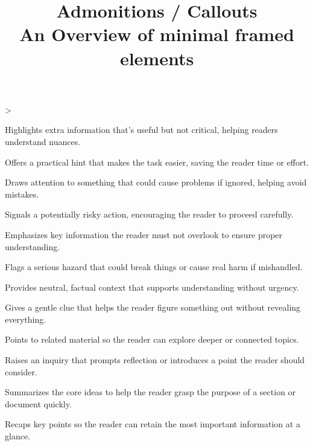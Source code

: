 \documentclass[twoside]{article}
\title{Admonitions / Callouts\\[0.5em]\large An Overview of \textbf{minimal} framed elements}
\author{}\date{}
\makeatletter
\newcommand\tsreplayfn{
\ts@loopcnt\z@
\loop
\advance\ts@loopcnt\@ne
\ifnum\ts@loopcnt>\ts@affilcnt\else
\xdef\@thefnmark{\csname ts@affilM\the\ts@loopcnt\endcsname}
\@footnotetext{\csname ts@affilT\the\ts@loopcnt\endcsname}
\repeat
}
\makeatother
\begin{document}
\twocolumn[{
\maketitle
}]
\tsreplayfn
\begin{tscallout}[kind=note]
Highlights extra information that's useful but not critical, helping readers understand nuances.
\end{tscallout}
\begin{tscallout}[kind=tip]
Offers a practical hint that makes the task easier, saving the reader time or effort.
\end{tscallout}
\begin{tscallout}[kind=warning]
Draws attention to something that could cause problems if ignored, helping avoid mistakes.
\end{tscallout}
\begin{tscallout}[kind=caution]
Signals a potentially risky action, encouraging the reader to proceed carefully.
\end{tscallout}
\begin{tscallout}[kind=important]
Emphasizes key information the reader must not overlook to ensure proper understanding.
\end{tscallout}
\begin{tscallout}[kind=danger]
Flags a serious hazard that could break things or cause real harm if mishandled.
\end{tscallout}
\begin{tscallout}[kind=info]
Provides neutral, factual context that supports understanding without urgency.
\end{tscallout}
\begin{tscallout}[kind=hint]
Gives a gentle clue that helps the reader figure something out without revealing everything.
\end{tscallout}
\begin{tscallout}[kind=seealso]
Points to related material so the reader can explore deeper or connected topics.
\end{tscallout}
\begin{tscallout}[kind=question]
Raises an inquiry that prompts reflection or introduces a point the reader should consider.
\end{tscallout}
\begin{tscallout}[kind=abstract]
Summarizes the core ideas to help the reader grasp the purpose of a section or document quickly.
\end{tscallout}
\begin{tscallout}[kind=summary]
Recaps key points so the reader can retain the most important information at a glance.
\end{tscallout}
\end{document}
